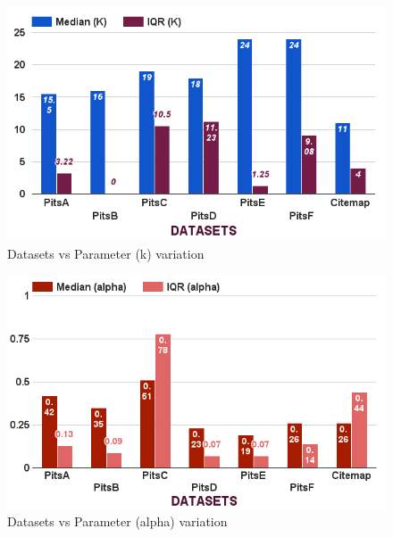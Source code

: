 \documentclass[conference]{IEEEtran}
\theoremstyle{break}
\begin{document}
\begin{center}
\begin{figure}[!h]
  \includegraphics[width=\linewidth]{./fig/Parameters_variation_k.png}
  \caption{Datasets vs Parameter (k) variation}
  \label{RQ3:k}
\end{figure}
\end{center}

\begin{center}
\begin{figure}[!h]
  \includegraphics[width=\linewidth]{./fig/Parameters_variation_a.png}
  \caption{Datasets vs Parameter (alpha) variation}
  \label{RQ3:a}
\end{figure}
\end{center}
\end{document}

